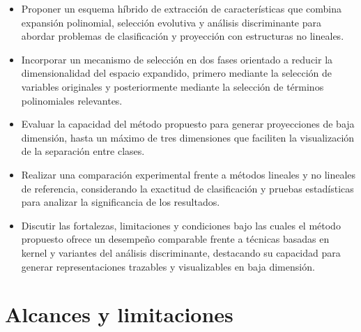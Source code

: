 \begin{itemize}

\item Proponer un esquema híbrido de extracción de características que combina expansión polinomial, selección evolutiva y análisis discriminante para abordar problemas de
clasificación y proyección con estructuras no lineales.

\item Incorporar un mecanismo de selección en dos fases orientado a reducir la dimensionalidad del espacio expandido, primero mediante la selección de variables originales y posteriormente mediante la selección de términos polinomiales relevantes.

\item Evaluar la capacidad del método propuesto para generar proyecciones de baja dimensión, hasta un máximo de tres dimensiones que faciliten la visualización de la separación entre clases.

\item Realizar una comparación experimental frente a métodos lineales y no lineales de referencia, considerando la exactitud de clasificación y pruebas estadísticas para analizar la significancia de los resultados.

\item Discutir las fortalezas, limitaciones y condiciones bajo las cuales el método propuesto ofrece un desempeño comparable frente a técnicas basadas en kernel y variantes del análisis discriminante, destacando su capacidad para generar representaciones trazables y visualizables en baja dimensión.
	
\end{itemize}

\section{Alcances y limitaciones}
\label{sec:Alcances-Limitaciones}


